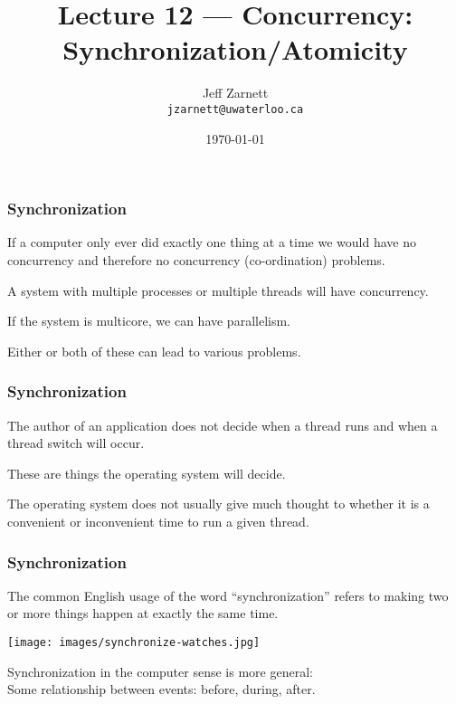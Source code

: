 

\title{Lecture 12 --- Concurrency: Synchronization/Atomicity }

\author{Jeff Zarnett \\ \small \texttt{jzarnett@uwaterloo.ca}}
\date{\today}




\begin{frame}
	\titlepage

\end{frame}


\begin{frame}
	\frametitle{Synchronization}

	If a computer only ever did exactly one thing at a time we would have no concurrency and therefore no concurrency (co-ordination) problems.

	A system with multiple processes or multiple threads will have concurrency.

	If the system is multicore, we can have parallelism.

	Either or both of these can lead to various problems.


\end{frame}

\begin{frame}
	\frametitle{Synchronization}

	The author of an application does not decide when a thread runs and when a thread switch will occur.

	These are things the operating system will decide.

	The operating system does not usually give much thought to whether it is a convenient or inconvenient time to run a given thread.


\end{frame}

\begin{frame}
	\frametitle{Synchronization}

	The common English usage of the word ``synchronization'' refers to making two or more things happen at exactly the same time.

	\begin{center}
		\texttt{[image: images/synchronize-watches.jpg]}
	\end{center}

	Synchronization in the computer sense is more general:\\
	\quad Some relationship between events: before, during, after.

\end{frame}


